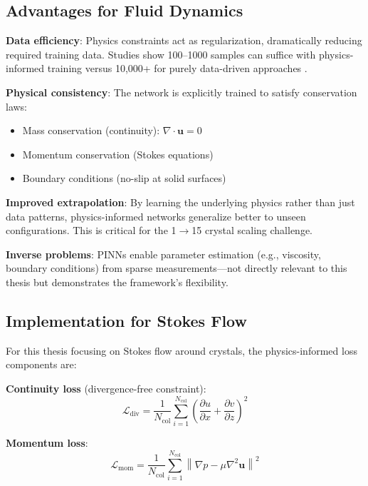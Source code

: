 \subsection{Advantages for Fluid Dynamics}

\textbf{Data efficiency}: Physics constraints act as regularization, dramatically reducing required training data. Studies show 100--1000 samples can suffice with physics-informed training versus 10,000+ for purely data-driven approaches \cite{raissi2019physics}.

\textbf{Physical consistency}: The network is explicitly trained to satisfy conservation laws:
\begin{itemize}
    \item Mass conservation (continuity): $\nabla \cdot \mathbf{u} = 0$
    \item Momentum conservation (Stokes equations)
    \item Boundary conditions (no-slip at solid surfaces)
\end{itemize}

\textbf{Improved extrapolation}: By learning the underlying physics rather than just data patterns, physics-informed networks generalize better to unseen configurations. This is critical for the 1$\rightarrow$15 crystal scaling challenge.

\textbf{Inverse problems}: PINNs enable parameter estimation (e.g., viscosity, boundary conditions) from sparse measurements---not directly relevant to this thesis but demonstrates the framework's flexibility.

\subsection{Implementation for Stokes Flow}

For this thesis focusing on Stokes flow around crystals, the physics-informed loss components are:

\textbf{Continuity loss} (divergence-free constraint):
\begin{equation}
\mathcal{L}_{\text{div}} = \frac{1}{N_{\text{col}}} \sum_{i=1}^{N_{\text{col}}} \left(\frac{\partial u}{\partial x} + \frac{\partial v}{\partial z}\right)^2
\label{eq:continuity_loss}
\end{equation}

\textbf{Momentum loss}:
\begin{equation}
\mathcal{L}_{\text{mom}} = \frac{1}{N_{\text{col}}} \sum_{i=1}^{N_{\text{col}}} \left\|\nabla p - \mu \nabla^2 \mathbf{u}\right\|^2
\end{equation}

